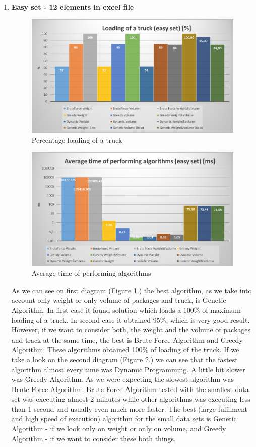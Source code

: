 \documentclass[conference,compsoc]{IEEEtran}
\begin{document}
\begin{enumerate}
\item \textbf{Easy set - 12 elements in excel file}
\begin{figure}[H]
  \centering
  \includegraphics[width=\columnwidth]{image003.png}
  \caption{Percentage loading of a truck }
\end{figure}

\begin{figure}[H]
  \centering
  \includegraphics[width=\columnwidth]{image006.png}
  \caption{Average time of performing algorithms}
\end{figure}


As we can see on first diagram (Figure 1.) the best algorithm, as we take into account only weight or only volume of packages and truck, is Genetic Algorithm. In first case it found solution which loads a 100\% of maximum loading of a truck. In second case it obtained 95\%, which is very good result. However, if we want to consider both, the weight and the volume of packages and track at the same time, the best is Brute Force Algorithm and Greedy Algorithm. These algorithms obtained 100\% of loading of the truck.
If we take a look on the second diagram (Figure 2.) we can see that the fastest algorithm almost every time was Dynamic Programming. A little bit slower was Greedy Algorithm. As we were expecting the slowest algorithm was Brute Force Algorithm. Brute Force Algorithm tested with the smallest data set was executing almost 2 minutes while other algorithms was executing  less than 1 second and usually even much more faster.
The best (large fulfilment and high speed of execution) algorithm for the small data sets is Genetic Algorithm - if we look only on weight or only on volume, and Greedy Algorithm - if we want to consider these both things.\\


\end{enumerate}
\end{document}
